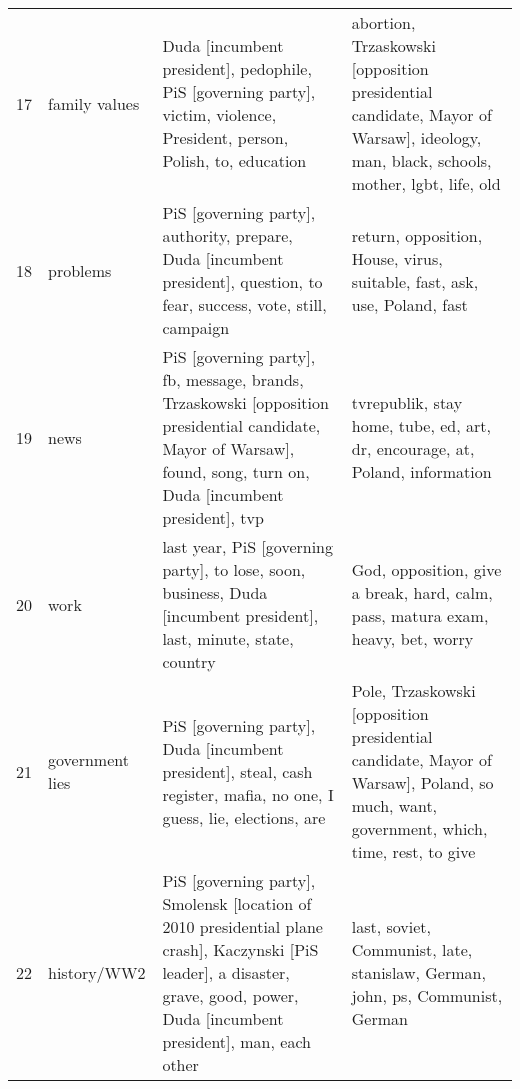 \begin{tabular}{p{2cm}p{2cm}p{5cm}p{5cm}}
          17 &            family values &                                                          Duda [incumbent president], pedophile, PiS [governing party], victim, violence, President, person, Polish, to, education &                                                               abortion, Trzaskowski [opposition presidential candidate, Mayor of Warsaw], ideology, man, black, schools, mother, lgbt, life, old \\
          18 &                 problems &                                                          PiS [governing party], authority, prepare, Duda [incumbent president], question, to fear, success, vote, still, campaign &                                                                                                                         return, opposition, House, virus, suitable, fast, ask, use, Poland, fast \\
          19 &                     news &               PiS [governing party], fb, message, brands, Trzaskowski [opposition presidential candidate, Mayor of Warsaw], found, song, turn on, Duda [incumbent president], tvp &                                                                                                                     tvrepublik, stay home, tube, ed, art, dr, encourage, at, Poland, information \\
          20 &                     work &                                                               last year, PiS [governing party], to lose, soon, business, Duda [incumbent president], last, minute, state, country &                                                                                                                  God, opposition, give a break, hard, calm, pass, matura exam, heavy, bet, worry \\
          21 &          government lies &                                                              PiS [governing party], Duda [incumbent president], steal, cash register, mafia, no one, I guess, lie, elections, are &                                                            Pole, Trzaskowski [opposition presidential candidate, Mayor of Warsaw], Poland, so much, want, government, which, time, rest, to give \\
          22 &              history/WW2 &  PiS [governing party], Smolensk [location of 2010 presidential plane crash], Kaczynski [PiS leader], a disaster, grave, good, power, Duda [incumbent president], man, each other &                                                                                                                    last, soviet, Communist, late, stanislaw, German, john, ps, Communist, German \\

\end{tabular}
